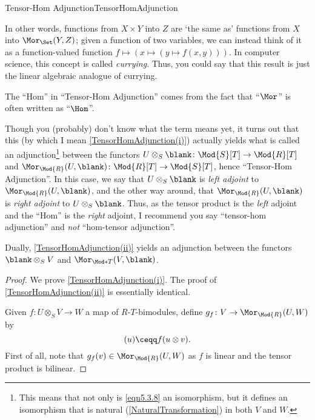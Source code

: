 \begin{thm}{Tensor-Hom Adjunction}{TensorHomAdjunction}
\begin{rmk}
\begin{equation*}
		\end{equation*}
		In other words, functions from $X\times Y$ into $Z$ are `the same as' functions from $X$ into $\Mor _{\Set}(Y,Z)$; given a function of two variables, we can instead think of it as a function-valued function $f\mapsto (x\mapsto (y\mapsto f(x,y)))$.  In computer science, this concept is called \emph{currying}.  Thus, you could say that this result is just the linear algebraic analogue of currying.
	\end{rmk}
	\begin{rmk}
		The ``Hom'' in ``Tensor-Hom Adjunction'' comes from the fact that ``$\Mor$'' is often written as ``$\Hom$''.
	\end{rmk}
	\begin{rmk}
		Though you (probably) don't know what the term means yet, it turns out that this (by which I mean \cref{TensorHomAdjunction(i)}) actually yields what is called an adjunction\footnote{This means that not only is \eqref{eqn5.3.8} an isomorphism, but it defines an isomorphism that is natural (\cref{NaturalTransformation}) in both $V$ and $W$.} between the functors $U\otimes _S\blank \colon \Mod{S}[T]\rightarrow \Mod{R}[T]$ and $\Mor _{\Mod{R}}(U,\blank )\colon \Mod{R}[T]\rightarrow \Mod{S}[T]$, hence ``Tensor-Hom Adjunction''.  In this case, we say that $U\otimes _S\blank$ is \emph{left adjoint} to $\Mor _{\Mod{R}}(U,\blank )$, and the other way around, that $\Mor _{\Mod{R}}(U,\blank )$ is \emph{right adjoint} to $U\otimes _S\blank$.  Thus, as the tensor product is the \emph{left} adjoint and the ``Hom'' is the \emph{right} adjoint, I recommend you say ``tensor-hom adjunction'' and \emph{not} ``hom-tensor adjunction''.
		
		Dually, \cref{TensorHomAdjunction(ii)} yields an adjunction between the functors $\blank \otimes _SV$ and $\Mor _{\Mod*{T}}(V,\blank )$.
	\end{rmk}
	\begin{proof}
		We prove \cref{TensorHomAdjunction(i)}.  The proof of \cref{TensorHomAdjunction(ii)} is essentially identical.
		
		Given $f\colon U\otimes _SV\rightarrow W$ a map of $R$-$T$-bimodules, define $g_f\colon V\rightarrow \Mor _{\Mod{R}}(U,W)$ by
		\begin{equation}
		[g_f(v)](u)\ceqq f(u\otimes v).
		\end{equation}
		First of all, note that $g_f(v)\in \Mor _{\Mod{R}}(U,W)$ as $f$ is linear and the tensor product is bilinear.
		

\end{proof}
\end{thm}
